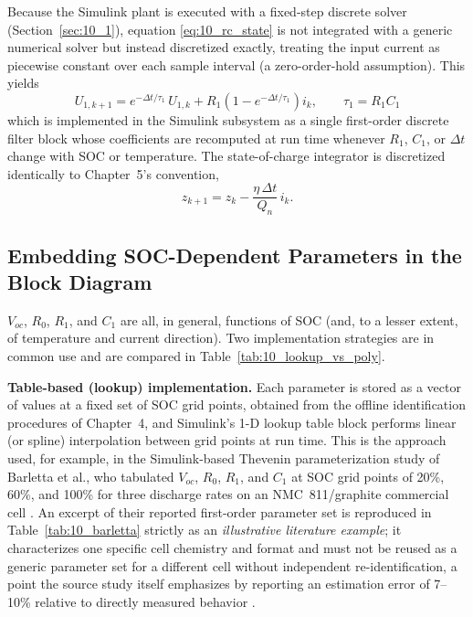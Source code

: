 Because the Simulink plant is executed with a fixed-step discrete
solver (Section~\ref{sec:10_1}), equation \eqref{eq:10_rc_state} is
not integrated with a generic numerical solver but instead
discretized exactly, treating the input current as piecewise constant
over each sample interval (a zero-order-hold assumption). This yields
\begin{equation}
U_{1,k+1} = e^{-\Delta t / \tau_1} \, U_{1,k} + R_1\left(1 - e^{-\Delta t/\tau_1}\right) i_k, \qquad \tau_1 = R_1 C_1
\label{eq:10_rc_discrete}
\end{equation}
which is implemented in the Simulink subsystem as a single first-order
discrete filter block whose coefficients are recomputed at run time
whenever $R_1$, $C_1$, or $\Delta t$ change with SOC or temperature.
The state-of-charge integrator is discretized identically to
Chapter~5's convention,
\begin{equation}
z_{k+1} = z_k - \frac{\eta \, \Delta t}{Q_n} \, i_k .
\label{eq:10_soc_discrete}
\end{equation}

\subsection{Embedding SOC-Dependent Parameters in the Block Diagram}

$V_{oc}$, $R_0$, $R_1$, and $C_1$ are all, in general, functions of
SOC (and, to a lesser extent, of temperature and current direction).
Two implementation strategies are in common use and are compared in
Table~\ref{tab:10_lookup_vs_poly}.

\textbf{Table-based (lookup) implementation.} Each parameter is stored
as a vector of values at a fixed set of SOC grid points, obtained from
the offline identification procedures of Chapter~4, and Simulink's
1-D lookup table block performs linear (or spline) interpolation
between grid points at run time. This is the approach used, for
example, in the Simulink-based Thevenin parameterization study of
Barletta et al., who tabulated $V_{oc}$, $R_0$, $R_1$, and $C_1$ at
SOC grid points of 20\%, 60\%, and 100\% for three discharge rates on
an NMC~811/graphite commercial cell \cite{barletta2022}. An excerpt of
their reported first-order parameter set is reproduced in
Table~\ref{tab:10_barletta} strictly as an \emph{illustrative literature
example}; it characterizes one specific cell chemistry and format and
must not be reused as a generic parameter set for a different cell
without independent re-identification, a point the source study itself
emphasizes by reporting an estimation error of 7--10\% relative to
directly measured behavior \cite{barletta2022}.

